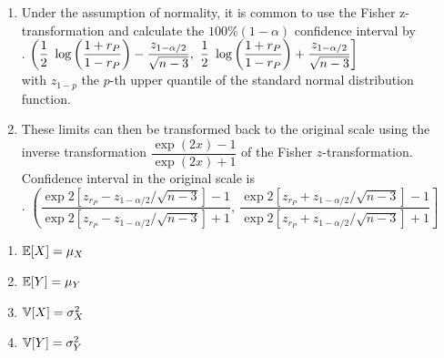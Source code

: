\begin{enumerate}[series=binvar-normal]
    \item Under the assumption of normality, it is common to use the Fisher z-transformation and calculate the $100\%(1 - \alpha)$ confidence interval by
    \hfill \cite{statistics/book/Statistics-for-Data-Scientists/Maurits-Kaptein}
    \\[0.3cm]
    .\hfill
    $
        \left(
            \dfrac{1}{2}\ \log\left(\dfrac{1 + r_P}{ 1 - r_P}\right) - \dfrac{z_{1-\alpha/2}}{\sqrt{n - 3}} ,
            \ \dfrac{1}{2}\ \log\left(\dfrac{1 + r_P}{ 1 - r_P}\right) + \dfrac{z_{1-\alpha/2}}{\sqrt{n - 3}}
        \right ]
    $
    \hfill \cite{statistics/book/Statistics-for-Data-Scientists/Maurits-Kaptein}
    \\[0.3cm]
    with $z_{1 - p}$ the $p$-th upper quantile of the standard normal distribution function.
    
    
    \item These limits can then be transformed back to the original scale using the inverse transformation $\dfrac{\exp({2x}) - 1}{\exp({2x}) + 1}$ of the Fisher $z$-transformation.
    Confidence interval in the original scale is
    \hfill \cite{statistics/book/Statistics-for-Data-Scientists/Maurits-Kaptein}
    \\[0.3cm]
    .\hfill
    $
        \left(
            \dfrac{\exp{2[z_{r_P} - z_{1-\alpha/2}/\sqrt{n-3}]} - 1}{\exp{2[z_{r_P} - z_{1-\alpha/2}/\sqrt{n-3}]} + 1},
            \ \dfrac{\exp{2[z_{r_P} + z_{1-\alpha/2}/\sqrt{n-3}]} - 1}{\exp{2[z_{r_P} + z_{1-\alpha/2}/\sqrt{n-3}]} + 1}
        \right]
    $
    \hfill \cite{statistics/book/Statistics-for-Data-Scientists/Maurits-Kaptein}
\end{enumerate}


\begin{multicols}{2}
\begin{enumerate}[resume*=binvar-normal]
    \item $\mathbb{E}[X] = \mu_X$
    \hfill \cite{statistics/book/Statistics-for-Data-Scientists/Maurits-Kaptein}
    
    \item $\mathbb{E}[Y] = \mu_Y$
    \hfill \cite{statistics/book/Statistics-for-Data-Scientists/Maurits-Kaptein}
    
    \item $\mathbb{V}[X] = \sigma^2_X$
    \hfill \cite{statistics/book/Statistics-for-Data-Scientists/Maurits-Kaptein}
    
    \item $\mathbb{V}[Y] = \sigma^2_Y$
    \hfill \cite{statistics/book/Statistics-for-Data-Scientists/Maurits-Kaptein}
\end{enumerate}
\end{multicols}




